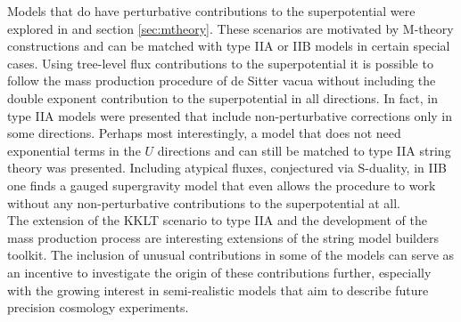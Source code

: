 \documentclass[12pt]{report}
\begin{document}
Models that do have perturbative contributions to the superpotential were explored in \cite{Cribiori:2019hrb} and section \ref{sec:mtheory}. These scenarios are motivated by M-theory constructions and can be matched with type IIA or IIB models in certain special cases. Using tree-level flux contributions to the superpotential it is possible to follow the mass production procedure of de Sitter vacua without including the double exponent contribution to the superpotential in all directions. In fact, in type IIA models were presented that include non-perturbative corrections only in some directions. Perhaps most interestingly, a model that does not need exponential terms in the $U$ directions and can still be matched to type IIA string theory was presented. Including atypical fluxes, conjectured via S-duality, in IIB one finds a gauged supergravity model that even allows the procedure to work without any non-perturbative contributions to the superpotential at all.\\
The extension of the KKLT scenario to type IIA and the development of the mass production process are interesting extensions of the string model builders toolkit. The inclusion of unusual contributions in some of the models can serve as an incentive to investigate the origin of these contributions further, especially with the growing interest in semi-realistic models that aim to describe future precision cosmology experiments.
\end{document}
